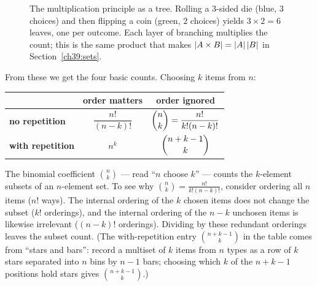 \begin{figure}[H]
\centering
{}
\caption{The multiplication principle as a tree. Rolling a $3$-sided die (blue,
$3$ choices) and then flipping a coin (green, $2$ choices) yields
$3 \times 2 = 6$ leaves, one per outcome. Each layer of branching multiplies
the count; this is the same product that makes $\lvert A\times B\rvert=\lvert A\rvert\,
\lvert B\rvert$ in Section~\ref{ch39:sets}.}
\label{ch39:treefig}
\end{figure}

From these we get the four basic counts. Choosing $k$ items from $n$:

\begin{center}
\begin{tabular}{lcc}
\toprule
 & \textbf{order matters} & \textbf{order ignored}\\
\midrule
\textbf{no repetition} & $\dfrac{n!}{(n-k)!}$ & $\dbinom{n}{k} =
  \dfrac{n!}{k!(n-k)!}$\\[1.2em]
\textbf{with repetition} & $n^{k}$ & $\dbinom{n+k-1}{k}$\\
\bottomrule
\end{tabular}
\end{center}

\begin{intuitionbox}
The binomial coefficient $\binom{n}{k}$ --- read ``$n$ choose $k$'' ---
counts the $k$-element subsets of an $n$-element set. To see why $\binom{n}{k}
= \frac{n!}{k!(n-k)!}$, consider ordering all $n$ items ($n!$ ways). The
internal ordering of the $k$ chosen items does not change the subset ($k!$
orderings), and the internal ordering of the $n-k$ unchosen items is likewise
irrelevant ($(n-k)!$ orderings). Dividing by these redundant orderings leaves
the subset count. (The with-repetition entry $\binom{n+k-1}{k}$ in the table comes from
``stars and bars'': record a multiset of $k$ items from $n$ types as a row of $k$ stars
separated into $n$ bins by $n-1$ bars; choosing which $k$ of the $n+k-1$ positions hold
stars gives $\binom{n+k-1}{k}$.)
\end{intuitionbox}

